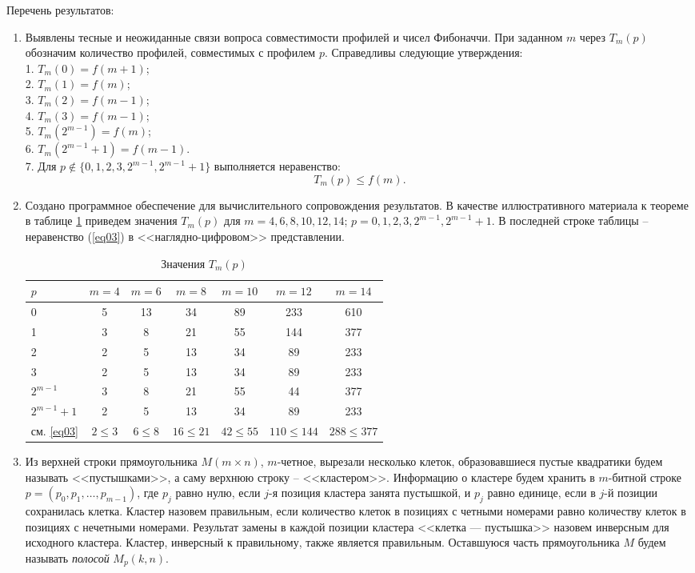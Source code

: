 Перечень результатов:
\begin{enumerate}
	\item 
Выявлены тесные и неожиданные связи вопроса совместимости профилей и чисел Фибоначчи.
При заданном $m$ через $T_m(p)$   обозначим количество профилей, совместимых с профилем $p$.
Справедливы следующие утверждения:\\
1. $T_m(0)=f(m+1)$;\\
2. $T_m(1) = f(m)$;\\
3. $T_m(2)=f(m-1)$;\\
4. $T_m(3)=f(m-1)$;\\
5. $T_m(2^{m-1})=f(m)$;\\
6. $T_m(2^{m-1}+1)=f(m-1)$.\\
7. Для $p\notin \{0,1,2,3,2^{m-1}, 2^{m-1}+1\}$
выполняется неравенство: 
\begin {equation} \label {eq03}
T_m(p) \le f(m).
\end{equation}
\item
Создано программное обеспечение для вычислительного сопровождения результатов.
В качестве иллюстративного материала к теореме в таблице \ref{tab01} приведем значения $T_m(p)$ для $m=4,6,8,10,12,14$; $p=0, 1, 2, 3, 2^{m-1}, 2^{m-1}+1$. В последней строке таблицы  -- неравенство (\ref{eq03}) в <<наглядно-цифровом>> представлении.

\begin{table}[ht]
\caption{Значения $T_m(p)$}
\centering
\label{tab01}
\footnotesize{
\begin{tabular} {|p{2cm}|c|c|c|c|c|c| }
\hline
$p$&$m=4$&$m=6$&$m=8$&$m=10$&$m=12$&$m=14$\\
\hline
\hline
0&5&13&34&89&233&610\\
\hline
1&3&8&21&55&144&377\\
\hline
2&2&5&13&34&89&233\\
\hline
3&2&5&13&34&89&233\\
\hline
$2^{m-1}$&3&8&21&55&44&377\\
\hline
$2^{m-1}+1$&2&5&13&34&89&233\\
\hline
\hline
см. \eqref{eq03}&$2\leq 3$&$6\leq 8 $&$16\leq 21$&$42\leq 55$&$110\leq 144$&$288 \leq 377$\\
\hline
\end{tabular}
}
\end{table}
\item 
Из верхней строки прямоугольника $M(m\times n)$, $m$-четное, вырезали несколько клеток, образовавшиеся пустые квадратики будем называть <<пустышками>>, а саму верхнюю строку -- <<кластером>>. Информацию о кластере будем хранить в $m$-битной строке \linebreak $p=(p_0, p_1, \dots, p_{m-1})$, где 
$p_j$ равно нулю, если $j$-я позиция кластера занята пустышкой, и $p_j$ равно единице, если в $j$-й позиции сохранилась клетка. Кластер назовем правильным, если количество клеток в позициях с четными номерами равно количеству клеток в позициях с нечетными номерами. Результат замены в каждой позиции кластера <<клетка --- пустышка>> назовем инверсным для исходного кластера. Кластер, инверсный к правильному, также является правильным.
Оставшуюся часть прямоугольника $M$ будем называть {\it полосой} $M_p(k,n)$.


\end{enumerate}
